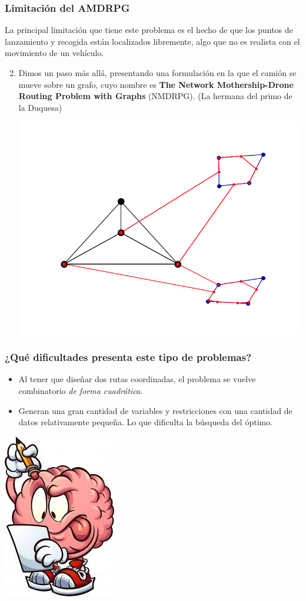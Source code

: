 \documentclass[slidestop,usepdftitle=false, xcolor=table]{beamer}
\begin{document}
	\begin{frame}
		\frametitle{Limitación del AMDRPG}
		La principal limitación que tiene este problema es el hecho de que los puntos de lanzamiento y recogida están localizados libremente, algo que no es realista con el movimiento de un vehículo.
		\begin{small}
			\begin{enumerate}
				\setcounter{enumi}{1}
				\item Dimos un paso más allá, presentando una formulación en la que el camión se mueve sobre un grafo, cuyo nombre es \textbf{The Network Mothership-Drone Routing Problem with Graphs} (NMDRPG). (La hermana del primo de la Duquesa)
				\begin{center}
					\includegraphics[width=0.5\linewidth]{NDMTZ}
				\end{center}
			\end{enumerate}
		\end{small}
	\end{frame}

	\begin{frame}
		\frametitle{¿Qué dificultades presenta este tipo de problemas?}
		\begin{itemize}
			\item Al tener que diseñar dos rutas coordinadas, el problema se vuelve combinatorio \textit{de forma cuadrática}.
			\item Generan una gran cantidad de variables y restricciones con una cantidad de datos relativamente pequeña. Lo que dificulta la búsqueda del óptimo.
		\end{itemize}
		\begin{center}
			\includegraphics[width=0.25\linewidth]{cerebro}
		\end{center}
	\end{frame}
\end{document}
